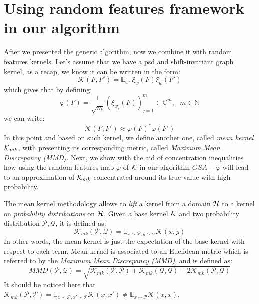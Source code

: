\section{Using random features framework in our algorithm}
After we presented the generic algorithm, now we combine it with random features kernels.
Let's assume that we have a psd and shift-invariant graph kernel, as a recap, we know it can be written in the form:
\begin{equation}
\mathcal{K}(F,F')= \mathbb{E}_w, \xi_w(F)\xi_w(F')
\end{equation}
which gives that by defining:
\begin{equation}
\varphi(F) = \frac{1}{\sqrt{m}} ( \xi_{w_j}(F) )_{j=1}^m \in \mathbb{C}^m,~~~ m\in \mathbb{N}
\end{equation}
we can write:
\[
\mathcal{K}(F,F')\approx \varphi(F)^*\varphi(F')
\]
In this point and based on such kernel, we define another one, called \emph{mean kernel} $\mathcal{K}_{mk}$, with presenting its corresponding metric, called \emph{Maximum Mean Discrepancy (MMD)}. Next, we show with the aid of concentration inequalities how using the random features map $\varphi$ of $\mathcal{K}$ in  our algorithm $GSA-\varphi$ will lead to an approximation of $\mathcal{K}_{mk}$ concentrated around its true value with high probability.

The mean kernel methodology allows to \emph{lift} a kernel from a domain $\mathcal{H}$ to a kernel on \emph{probability distributions} on $\mathcal{H}$. Given a base kernel $\mathcal{K}$ and two probability distribution $\mathcal{P},\mathcal{Q}$, it is defined as:
\begin{equation}
\label{eq:mean_kernel}
\mathcal{K}_{mk}(\mathcal{P},\mathcal{Q}) = \mathbb{E}_{x \sim \mathcal{P}, y \sim \mathcal{Q}} \mathcal{K}(x,y)
\end{equation}
In other words, the mean kernel is just the expectation of the base kernel with respect to each term. Mean kernel is associated to an Euclidean metric which is referred to by the  \emph{Maximum Mean Discrepancy (MMD)}, and is defined as:
\begin{equation}\label{eq:MMD}
MMD(\mathcal{P},\mathcal{Q}) = \sqrt{\mathcal{K}_{mk}(\mathcal{P},\mathcal{P}) + \mathcal{K}_{mk}(\mathcal{Q},\mathcal{Q}) - 2\mathcal{K}_{mk}(\mathcal{P},\mathcal{Q})}
\end{equation}
It should be noticed here that $\mathcal{K}_{mk}(\mathcal{P},\mathcal{P}) = \mathbb{E}_{x \sim \mathcal{P}, x' \sim \mathcal{P}} \mathcal{K}(x,x') \neq \mathbb{E}_{x \sim \mathcal{P}} \mathcal{K}(x,x)$.

